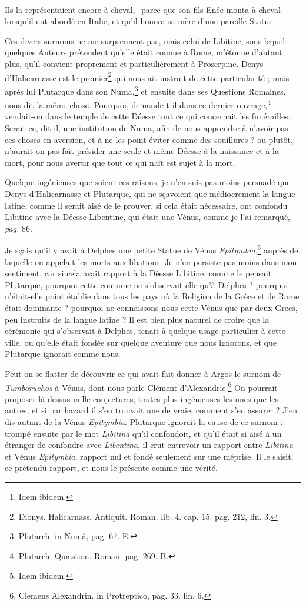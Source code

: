 \documentclass[a4paper, 18pt, oneside]{article}
\begin{document}
Ils la représentaient encore à cheval,\footnote{Idem ibidem.} parce que son fils Enée monta à cheval lorsqu'il eut abordé en Italie, et qu'il honora sa mère d'une pareille Statue.

Ces divers surnoms ne me surprennent pas, mais celui de Libitine, sous lequel quelques Auteurs prétendent qu'elle était connue à Rome, m'étonne d'autant plus, qu'il convient proprement et particulièrement à Proserpine. Denys d'Halicarnasse est le premier\footnote{Dionys. Halicarnass. Antiquit. Roman. lib. 4. cap. 15. pag. 212, lin. 3.} qui nous ait instruit de cette particularité ; mais après lui Plutarque dans son Numa,\footnote{Plutarch. in Numâ, pag. 67. E.} et ensuite dans ses Questions Romaines, nous dit la même chose. Pourquoi, demande-t-il dans ce dernier ouvrage,\footnote{Plutarch. Quæstion. Roman. pag. 269. B.} vendait-on dans le temple de cette Déesse tout ce qui concernait les funérailles. Serait-ce, dit-il, une institution de Numa, afin de nous apprendre à n'avoir pas ces choses en aversion, et à ne les point éviter comme des souillures ? ou plutôt, n'aurait-on pas fait présider une seule et même Déesse à la naissance et à la mort, pour nous avertir que tout ce qui naît est sujet à la mort.

Quelque ingénieuses que soient ces raisons, je n'en suis pas moins persuadé que Denys d'Halicarnasse et Plutarque, qui ne sçavoient que médiocrement la langue latine, comme il serait aisé de le prouver, si cela était nécessaire, ont confondu Libitine avec la Déesse Libentine, qui était une Vénus, comme je l'ai remarqué, \emph{pag.} 86.

Je sçais qu'il y avait à Delphes une petite Statue de Vénus \emph{Epitymbia},\footnote{Idem ibidem.} auprès de laquelle on appelait les morts aux libations. Je n'en persiste pas moins dans mon sentiment, car si cela avait rapport à la Déesse Libitine, comme le pensait Plutarque, pourquoi cette coutume ne s'observait elle qu'à Delphes ? pourquoi n'était-elle point établie dans tous les pays où la Religion de la Grèce et de Rome était dominante ? pourquoi ne connaissons-nous cette Vénus que par deux Grecs, peu instruits de la langue latine ? Il est bien plus naturel de croire que la cérémonie qui s'observait à Delphes, tenait à quelque usage particulier à cette ville, ou qu'elle était fondée sur quelque aventure que nous ignorons, et que Plutarque ignorait comme nous.

Peut-on se flatter de découvrir ce qui avait fait donner à Argos le surnom de \emph{Tumboruchos} à Vénus, dont nous parle Clément d'Alexandrie.\footnote{Clemens Alexandrin. in Protreptico, pag. 33. lin. 6.} On pourrait proposer là-dessus mille conjectures, toutes plus ingénieuses les unes que les autres, et si par hazard il s'en trouvait une de vraie, comment s'en assurer ? J'en dis autant de la Vénus \emph{Epitymbia}. Plutarque ignorait la cause de ce surnom : trompé ensuite par le mot \emph{Libitina} qu'il confondoit, et qu'il était si aisé à un étranger de confondre avec \emph{Libentina}, il crut entrevoir un rapport entre \emph{Libitina} et Vénus \emph{Epitymbia}, rapport nul et fondé seulement sur une méprise. Il le saisit, ce prétendu rapport, et nous le présente comme une vérité.
\end{document}
